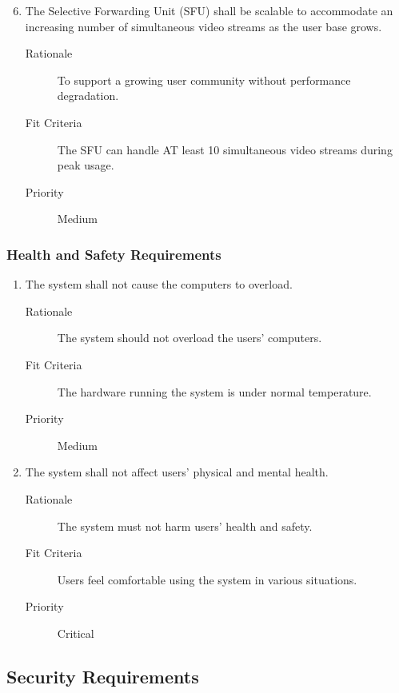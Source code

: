 \documentclass{article}
\begin{document}
\begin{enumerate}[PR1]
  \setcounter{enumi}{5}
\item The Selective Forwarding Unit (SFU) shall be scalable to accommodate
  an increasing number of simultaneous video streams as the user base
  grows. \label{PR6}
  \begin{description}
  \item[Rationale] To support a growing user community without performance
    degradation.
  \item[Fit Criteria] The SFU can handle AT least 10 simultaneous
    video streams during peak usage.
  \item[Priority] Medium
  \end{description}
\end{enumerate}

\subsubsection{Health and Safety Requirements}

\begin{enumerate}[HS1]
\item The system shall not cause the computers to overload. \label{HS1}
	\begin{description}
  \item[Rationale] The system should not overload the users' computers.
	\item[Fit Criteria] The hardware running the system is under normal temperature.
	\item[Priority] Medium
  \end{description}
\item The system shall not affect users' physical and mental health. \label{HS2}
  \begin{description}
  \item[Rationale] The system must not harm users' health and safety.
  \item[Fit Criteria] Users feel comfortable using the system in various
    situations.
  \item[Priority] Critical
  \end{description}
\end{enumerate}

\subsection{Security Requirements}
\end{document}
